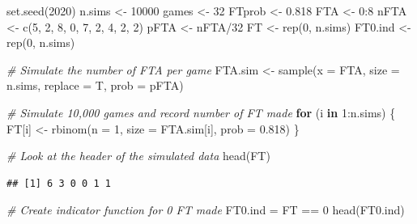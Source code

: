 \documentclass[
  11pt,
]{book}
\newenvironment{Shaded}{\begin{snugshade}}{\end{snugshade}}
\newcommand{\AttributeTok}[1]{\textcolor[rgb]{0.77,0.63,0.00}{#1}}
\newcommand{\CommentTok}[1]{\textcolor[rgb]{0.56,0.35,0.01}{\textit{#1}}}
\newcommand{\ControlFlowTok}[1]{\textcolor[rgb]{0.13,0.29,0.53}{\textbf{#1}}}
\newcommand{\DecValTok}[1]{\textcolor[rgb]{0.00,0.00,0.81}{#1}}
\newcommand{\FloatTok}[1]{\textcolor[rgb]{0.00,0.00,0.81}{#1}}
\newcommand{\FunctionTok}[1]{\textcolor[rgb]{0.00,0.00,0.00}{#1}}
\newcommand{\NormalTok}[1]{#1}
\newcommand{\OtherTok}[1]{\textcolor[rgb]{0.56,0.35,0.01}{#1}}
\newcommand{\SpecialCharTok}[1]{\textcolor[rgb]{0.00,0.00,0.00}{#1}}
\theoremstyle{definition}
\theoremstyle{definition}
\theoremstyle{definition}
\theoremstyle{definition}
\theoremstyle{remark}
\begin{document}
\begin{Shaded}
\begin{Highlighting}[]
\FunctionTok{set.seed}\NormalTok{(}\DecValTok{2020}\NormalTok{)}
\NormalTok{n.sims }\OtherTok{\textless{}{-}} \DecValTok{10000}
\NormalTok{games }\OtherTok{\textless{}{-}} \DecValTok{32}
\NormalTok{FTprob }\OtherTok{\textless{}{-}} \FloatTok{0.818}
\NormalTok{FTA }\OtherTok{\textless{}{-}} \DecValTok{0}\SpecialCharTok{:}\DecValTok{8}
\NormalTok{nFTA }\OtherTok{\textless{}{-}} \FunctionTok{c}\NormalTok{(}\DecValTok{5}\NormalTok{, }\DecValTok{2}\NormalTok{, }\DecValTok{8}\NormalTok{, }\DecValTok{0}\NormalTok{, }\DecValTok{7}\NormalTok{, }\DecValTok{2}\NormalTok{, }\DecValTok{4}\NormalTok{, }\DecValTok{2}\NormalTok{, }\DecValTok{2}\NormalTok{)}
\NormalTok{pFTA }\OtherTok{\textless{}{-}}\NormalTok{ nFTA}\SpecialCharTok{/}\DecValTok{32}
\NormalTok{FT }\OtherTok{\textless{}{-}} \FunctionTok{rep}\NormalTok{(}\DecValTok{0}\NormalTok{, n.sims)}
\NormalTok{FT0.ind }\OtherTok{\textless{}{-}} \FunctionTok{rep}\NormalTok{(}\DecValTok{0}\NormalTok{, n.sims)}

\CommentTok{\# Simulate the number of FTA per game}
\NormalTok{FTA.sim }\OtherTok{\textless{}{-}} \FunctionTok{sample}\NormalTok{(}\AttributeTok{x =}\NormalTok{ FTA, }\AttributeTok{size =}\NormalTok{ n.sims, }\AttributeTok{replace =}\NormalTok{ T, }\AttributeTok{prob =}\NormalTok{ pFTA)}

\CommentTok{\# Simulate 10,000 games and record number of FT made}
\ControlFlowTok{for}\NormalTok{ (i }\ControlFlowTok{in} \DecValTok{1}\SpecialCharTok{:}\NormalTok{n.sims) \{}
\NormalTok{    FT[i] }\OtherTok{\textless{}{-}} \FunctionTok{rbinom}\NormalTok{(}\AttributeTok{n =} \DecValTok{1}\NormalTok{, }\AttributeTok{size =}\NormalTok{ FTA.sim[i], }\AttributeTok{prob =} \FloatTok{0.818}\NormalTok{)}
\NormalTok{\}}

\CommentTok{\# Look at the header of the simulated data}
\FunctionTok{head}\NormalTok{(FT)}
\end{Highlighting}
\end{Shaded}

\begin{verbatim}
## [1] 6 3 0 0 1 1
\end{verbatim}

\begin{Shaded}
\begin{Highlighting}[]
\CommentTok{\# Create indicator function for 0 FT made}
\NormalTok{FT0.ind }\OtherTok{=}\NormalTok{ FT }\SpecialCharTok{==} \DecValTok{0}
\FunctionTok{head}\NormalTok{(FT0.ind)}
\end{Highlighting}
\end{Shaded}
\end{document}
